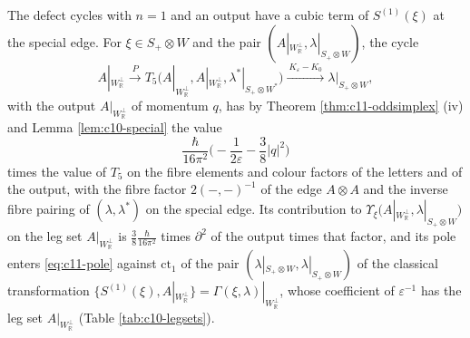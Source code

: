 \begin{example}
\label{ex:c11-cubic}
The defect cycles with $n=1$ and an output have a cubic term of $S^{(1)}(\xi)$ at the special edge. For $\xi\in S_+\otimes W$ and the pair $(A|_{W_{\mathbb R}^\perp},\lambda|_{S_+\otimes W})$, the cycle
\[
A|_{W_{\mathbb R}^\perp}\xrightarrow{\ P\ }T_5\big(A|_{W_{\mathbb R}^\perp},A|_{W_{\mathbb R}^\perp},\lambda^*|_{S_+\otimes W^*}\big)\xrightarrow{\ K_\varepsilon-K_0\ }\lambda|_{S_+\otimes W},
\]
with the output $A|_{W_{\mathbb R}^\perp}$ of momentum $q$, has by Theorem \ref{thm:c11-oddsimplex} (iv) and Lemma \ref{lem:c10-special} the value
\[
\frac{\hbar}{16\pi^2}\Big(-\frac1{2\varepsilon}-\frac38|q|^2\Big)
\]
times the value of $T_5$ on the fibre elements and colour factors of the letters and of the output, with the fibre factor $2(-,-)^{-1}$ of the edge $A\otimes A$ and the inverse fibre pairing of $(\lambda,\lambda^*)$ on the special edge. Its contribution to $\Upsilon_\xi\big(A|_{W_{\mathbb R}^\perp},\lambda|_{S_+\otimes W}\big)$ on the leg set $A|_{W_{\mathbb R}^\perp}$ is $\tfrac38\frac{\hbar}{16\pi^2}$ times $\partial^2$ of the output times that factor, and its pole enters \eqref{eq:c11-pole} against $\mathrm{ct}_1$ of the pair $(\lambda|_{S_+\otimes W},\lambda|_{S_+\otimes W})$ of the classical transformation $\{S^{(1)}(\xi),A|_{W_{\mathbb R}^\perp}\}=\Gamma(\xi,\lambda)|_{W_{\mathbb R}^\perp}$, whose coefficient of $\varepsilon^{-1}$ has the leg set $A|_{W_{\mathbb R}^\perp}$ (Table \ref{tab:c10-legsets}).
\end{example}

